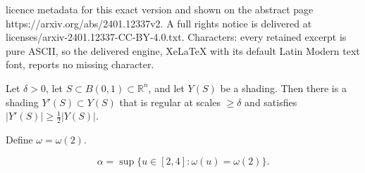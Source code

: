 \documentclass[10pt,a4paper]{amsart}
\newcommand{\RR}{\mathbb{R}}
\begin{document}
licence metadata for this exact version and shown on the abstract page https://arxiv.org/abs/2401.12337v2. A full rights notice is delivered at licenses/arxiv-2401.12337-CC-BY-4.0.txt. Characters: every retained excerpt is pure ASCII, so the delivered engine, XeLaTeX with its default Latin Modern text font, reports no missing character.
\begin{lem}\label{findRegularShading}
Let $\delta>0$, let $S\subset B(0,1)\subset \RR^n$, and let $Y(S)$ be a shading. Then there is a shading $Y'(S)\subset Y(S)$ that is regular at scales $\geq\delta$ and satisfies $|Y'(S)|\geq\frac{1}{2}|Y(S)|$. 
\end{lem}

\begin{defn}\label{defnOmega}
Define $\omega = \omega(2)$.
\end{defn}

 \begin{equation}\label{defnAlphaEqn}
\alpha = \sup\{u\in [2,4] \colon \omega(u)=\omega(2)\}.
 \end{equation}
\end{document}
